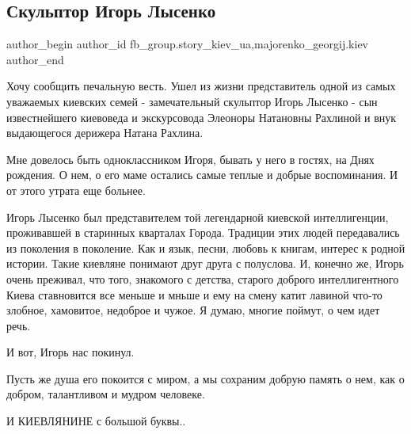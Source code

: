  
 
 
 
 
 
\subsection{Скульптор Игорь Лысенко}
\label{sec:23_07_2021.fb.fb_group.story_kiev_ua.2.skulptor_igor_lysenko}
 
\ifcmt
 author_begin
   author_id fb_group.story_kiev_ua,majorenko_georgij.kiev
 author_end
\fi

Хочу сообщить печальную весть. Ушел из жизни представитель одной из самых
уважаемых киевских семей - замечательный скульптор Игорь Лысенко - сын
известнейшего киевоведа и экскурсовода Элеоноры Натановны Рахлиной и внук
выдающегося дерижера Натана Рахлина.

\raggedcolumns
\begin{multicols}{2} %
\setlength{\parindent}{0pt}


\end{multicols} %

Мне довелось быть одноклассником Игоря, бывать у него в гостях, на Днях
рождения. О нем, о его маме остались самые теплые и добрые воспоминания. И от
этого утрата еще больнее.

Игорь Лысенко был представителем той легендарной киевской интеллигенции,
проживавшей в старинных кварталах Города. Традиции этих людей передавались из
поколения в поколение. Как и язык, песни, любовь к книгам, интерес к родной
истории. Такие киевляне понимают друг друга с полуслова. И, конечно же, Игорь
очень преживал, что того, знакомого с детства, старого доброго интеллигентного
Киева ставновится все меньше и мньше и ему на смену катит лавиной что-то
злобное, хамовитое, недоброе и чужое. Я думаю, многие поймут, о чем идет речь.

И вот, Игорь нас покинул.

Пусть же душа его покоится с миром, а мы сохраним добрую память о нем, как о
добром, талантливом и мудром человеке.

И КИЕВЛЯНИНЕ с большой буквы..
